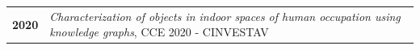 \documentclass[blue]{pastelcv}              %
\begin{document}
\begin{paracol}{2}
\begin{tabular}{>{\footnotesize\bfseries}r >{\footnotesize}p{}}
  2020 & 
  \emph{Characterization of objects in indoor spaces of human occupation using
  knowledge graphs}, CCE 2020 - CINVESTAV
\end{tabular}
\smallskip



\end{paracol}
\end{document}
